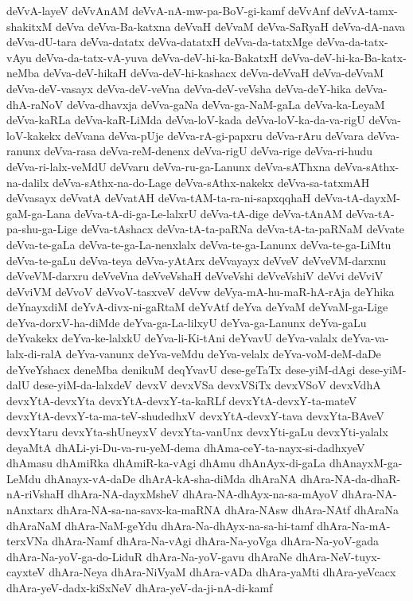{deVvA-layeV
deVvAnAM
deVvA-nA-mw-pa-BoV-gi-kamf
deVvAnf
deVvA-tamx-shakitxM
deVva
deVva-Ba-katxna
deVvaH
deVvaM
deVva-SaRyaH
deVva-dA-nava
deVva-dU-tara
deVva-datatx
deVva-datatxH
deVva-da-tatxMge
deVva-da-tatx-vAyu
deVva-da-tatx-vA-yuva
deVva-deV-hi-ka-BakatxH
deVva-deV-hi-ka-Ba-katx-neMba
deVva-deV-hikaH
deVva-deV-hi-kashacx
deVva-deVvaH
deVva-deVvaM
deVva-deV-vasayx
deVva-deV-veVna
deVva-deV-veVsha
deVva-deY-hika
deVva-dhA-raNoV
deVva-dhavxja
deVva-gaNa
deVva-ga-NaM-gaLa
deVva-ka-LeyaM
deVva-kaRLa
deVva-kaR-LiMda
deVva-loV-kada
deVva-loV-ka-da-va-rigU
deVva-loV-kakekx
deVvana
deVva-pUje
deVva-rA-gi-papxru
deVva-rAru
deVvara
deVva-ranunx
deVva-rasa
deVva-reM-denenx
deVva-rigU
deVva-rige
deVva-ri-hudu
deVva-ri-lalx-veMdU
deVvaru
deVva-ru-ga-Lanunx
deVva-sAThxna
deVva-sAthx-na-dalilx
deVva-sAthx-na-do-Lage
deVva-sAthx-nakekx
deVva-sa-tatxmAH
deVvasayx
deVvatA
deVvatAH
deVva-tAM-ta-ra-ni-sapxqqhaH
deVva-tA-dayxM-gaM-ga-Lana
deVva-tA-di-ga-Le-lalxrU
deVva-tA-dige
deVva-tAnAM
deVva-tA-pa-shu-ga-Lige
deVva-tAshacx
deVva-tA-ta-paRNa
deVva-tA-ta-paRNaM
deVvate
deVva-te-gaLa
deVva-te-ga-La-nenxlalx
deVva-te-ga-Lanunx
deVva-te-ga-LiMtu
deVva-te-gaLu
deVva-teya
deVva-yAtArx
deVvayayx
deVveV
deVveVM-darxnu
deVveVM-darxru
deVveVna
deVveVshaH
deVveVshi
deVveVshiV
deVvi
deVviV
deVviVM
deVvoV
deVvoV-tasxveV
deVvw
deVya-mA-hu-maR-hA-rAja
deYhika
deYnayxdiM
deYvA-divx-ni-gaRtaM
deYvAtf
deYva
deYvaM
deYvaM-ga-Lige
deYva-dorxV-ha-diMde
deYva-ga-La-lilxyU
deYva-ga-Lanunx
deYva-gaLu
deYvakekx
deYva-ke-lalxkU
deYva-li-Ki-tAni
deYvavU
deYva-valalx
deYva-va-lalx-di-ralA
deYva-vanunx
deYva-veMdu
deYva-velalx
deYva-voM-deM-daDe
deYveYshacx
deneMba
denikuM
deqYvavU
dese-geTaTx
dese-yiM-dAgi
dese-yiM-dalU
dese-yiM-da-lalxdeV
devxV
devxVSa
devxVSiTx
devxVSoV
devxVdhA
devxYtA-devxYta
devxYtA-devxY-ta-kaRLf
devxYtA-devxY-ta-mateV
devxYtA-devxY-ta-ma-teV-shudedhxV
devxYtA-devxY-tava
devxYta-BAveV
devxYtaru
devxYta-shUneyxV
devxYta-vanUnx
devxYti-gaLu
devxYti-yalalx
deyaMtA
dhALi-yi-Du-va-ru-yeM-dema
dhAma-ceY-ta-nayx-si-dadhxyeV
dhAmasu
dhAmiRka
dhAmiR-ka-vAgi
dhAmu
dhAnAyx-di-gaLa
dhAnayxM-ga-LeMdu
dhAnayx-vA-daDe
dhArA-kA-sha-diMda
dhAraNA
dhAra-NA-da-dhaR-nA-riVshaH
dhAra-NA-dayxMsheV
dhAra-NA-dhAyx-na-sa-mAyoV
dhAra-NA-nAnxtarx
dhAra-NA-sa-na-savx-ka-maRNA
dhAra-NAsw
dhAra-NAtf
dhAraNa
dhAraNaM
dhAra-NaM-geYdu
dhAra-Na-dhAyx-na-sa-hi-tamf
dhAra-Na-mA-terxVNa
dhAra-Namf
dhAra-Na-vAgi
dhAra-Na-yoVga
dhAra-Na-yoV-gada
dhAra-Na-yoV-ga-do-LiduR
dhAra-Na-yoV-gavu
dhAraNe
dhAra-NeV-tuyx-cayxteV
dhAra-Neya
dhAra-NiVyaM
dhAra-vADa
dhAra-yaMti
dhAra-yeVcacx
dhAra-yeV-dadx-kiSxNeV
dhAra-yeV-da-ji-nA-di-kamf
}
